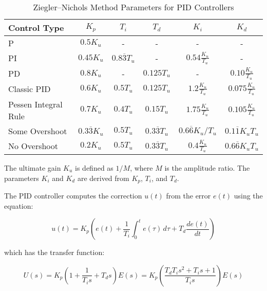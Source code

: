 \begin{table}[ht]
    \centering
    \caption{Ziegler--Nichols Method Parameters for PID Controllers}
    \label{tab:ziegler-nichols}
    \begin{tabular}{|l|c|c|c|c|c|}
        \hline
        Control Type         & \( K_p \)                  & \( T_i \)                  & \( T_d \)                   & \( K_i \)                      & \( K_d \)                      \\
        \hline
        P                    & \( 0.5 K_u \)              & -                          & -                           & -                              & -                              \\
        PI                   & \( 0.45 K_u \)             & \( 0.8 \overline{3} T_u \) & -                           & \( 0.54 \frac{K_u}{T_u} \)     & -                              \\
        PD                   & \( 0.8 K_u \)              & -                          & \( 0.125 T_u \)             & -                              & \( 0.10 \frac{K_u}{T_u} \)     \\
        Classic PID          & \( 0.6 K_u \)              & \( 0.5 T_u \)              & \( 0.125 T_u \)             & \( 1.2 \frac{K_u}{T_u} \)      & \( 0.075 \frac{K_u}{T_u} \)    \\
        Pessen Integral Rule & \( 0.7 K_u \)              & \( 0.4 T_u \)              & \( 0.15 T_u \)              & \( 1.75 \frac{K_u}{T_u} \)     & \( 0.105 \frac{K_u}{T_u} \)    \\
        Some Overshoot       & \( 0.3 \overline{3} K_u \) & \( 0.5 T_u \)              & \( 0.3 \overline{3}{T_u} \) & \( 0.6 \overline{6} K_u/T_u \) & \( 0.1 \overline{1} K_u T_u \) \\
        No Overshoot         & \( 0.2 K_u \)              & \( 0.5 T_u \)              & \( 0.3 \overline{3}{T_u} \) & \( 0.4 \frac{K_u}{T_u} \)      & \( 0.6 \overline{6} K_u T_u \) \\
        \hline
    \end{tabular}
\end{table}

The ultimate gain \( K_u \) is defined as \( 1/M \), where \( M \) is the
amplitude ratio. The parameters \( K_i \) and \( K_d \) are derived from \( K_p
\), \( T_i \), and \( T_d \).

The PID controller computes the correction \( u(t) \) from the error \( e(t) \)
using the equation:

\[
    u(t) = K_p \left( e(t) + \frac{1}{T_i} \int_0^t e(\tau) \, d\tau + T_d \frac{de(t)}{dt} \right)
\]

which has the transfer function:

\[
    U(s) = K_p \left( 1 + \frac{1}{T_i s} + T_d s \right) E(s) = K_p \left( \frac{T_d T_i s^2 + T_i s + 1}{T_i s} \right) E(s)
\]